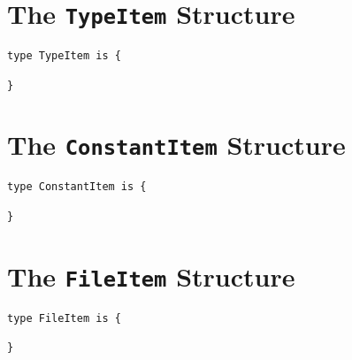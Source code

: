 \section{The {\tt TypeItem} Structure}

\begin{lstlisting}
type TypeItem is {

}
\end{lstlisting}

\section{The {\tt ConstantItem} Structure}

\begin{lstlisting}
type ConstantItem is {

}
\end{lstlisting}

\section{The {\tt FileItem} Structure}

\begin{lstlisting}
type FileItem is {

}
\end{lstlisting}
